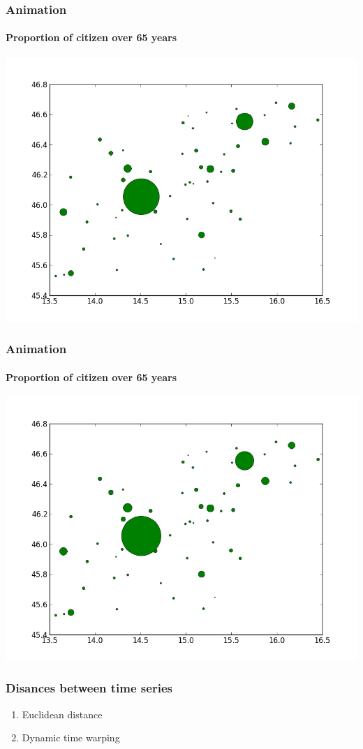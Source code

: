 \documentclass{beamer}
\begin{document}
\begin{frame}
	\frametitle{Animation}
	\framesubtitle{Proportion of citizen over 65 years}
	\includegraphics[scale=0.5]{../results/65/prebivalstvo_2004H1.png}
\end{frame} 

\begin{frame}
	\frametitle{Animation}
	\framesubtitle{Proportion of citizen over 65 years}
	\includegraphics[scale=0.5]{../results/65/prebivalstvo_2008H1.png}
\end{frame} 

\begin{frame}
	\frametitle{Disances between time series}
	\begin{enumerate}
		\item Euclidean distance
		\item Dynamic time warping
	\end{enumerate}
\end{frame} 
\end{document}
